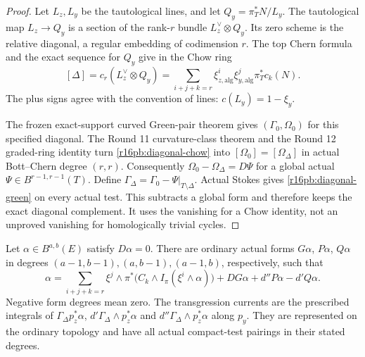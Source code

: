 \begin{proof}
Let $L_z,L_y$ be the tautological lines, and let
$Q_y=\pi_T^*N/L_y$. The tautological map $L_z\to Q_y$ is a section
of the rank-$r$ bundle $L_z^\vee\otimes Q_y$. Its zero scheme is the
relative diagonal, a regular embedding of codimension $r$. The top
Chern formula and the exact sequence for $Q_y$ give in the Chow ring
\[
 [\Delta]=c_r(L_z^\vee\otimes Q_y)
         =\sum_{i+j+k=r}\xi_{z,\mathrm{alg}}^i
                         \xi_{y,\mathrm{alg}}^j\pi_T^*c_k(N).
 \tag{PB16.3}\label{r16pb:diagonal-chow}
\]
The plus signs agree with the convention of lines: $c(L_y)=1-\xi_y$.

The frozen exact-support curved Green-pair theorem gives
$(\Gamma_0,\Omega_0)$ for this specified diagonal. The Round 11
curvature-class theorem and the Round 12 graded-ring identity turn
\eqref{r16pb:diagonal-chow} into
$[\Omega_0]=[\Omega_\Delta]$ in actual Bott--Chern degree $(r,r)$.
Consequently $\Omega_0-\Omega_\Delta=D\Psi$ for a global actual
$\Psi\in B^{r-1,r-1}(T)$. Define
$\Gamma_\Delta=\Gamma_0-\Psi|_{T\setminus\Delta}$.
Actual Stokes gives \eqref{r16pb:diagonal-green} on every actual
test. This subtracts a global form and therefore keeps the exact
diagonal complement. It uses the vanishing for a Chow identity,
not an unproved vanishing for homologically trivial cycles.
\end{proof}

\begin{proposition}
\label{r16pb:homotopy}
Let $\alpha\in B^{a,b}(E)$ satisfy $D\alpha=0$.
There are ordinary actual forms $G\alpha$, $P\alpha$, $Q\alpha$
in degrees $(a-1,b-1),(a,b-1),(a-1,b)$, respectively, such that
\[
 \alpha=
   \sum_{i+j+k=r}\xi^j\wedge\pi^*
            \bigl(C_k\wedge I_\pi(\xi^i\wedge\alpha)\bigr)
       +DG\alpha+d''P\alpha-d'Q\alpha.
 \tag{PB16.4}\label{r16pb:homotopy-formula}
\]
Negative form degrees mean zero. The transgression currents are the
prescribed integrals of $\Gamma_\Delta p_z^*\alpha$,
$d'\Gamma_\Delta\wedge p_z^*\alpha$ and
$d''\Gamma_\Delta\wedge p_z^*\alpha$ along $p_y$.
They are represented on the ordinary topology and have all actual
compact-test pairings in their stated degrees.
\end{proposition}


